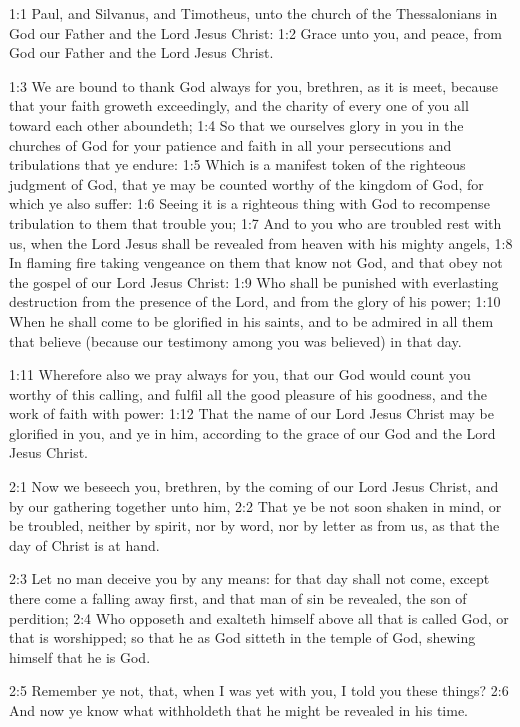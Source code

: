 

1:1 Paul, and Silvanus, and Timotheus, unto the church of the
Thessalonians in God our Father and the Lord Jesus Christ: 1:2 Grace
unto you, and peace, from God our Father and the Lord Jesus Christ.

1:3 We are bound to thank God always for you, brethren, as it is meet,
because that your faith groweth exceedingly, and the charity of every
one of you all toward each other aboundeth; 1:4 So that we ourselves
glory in you in the churches of God for your patience and faith in all
your persecutions and tribulations that ye endure: 1:5 Which is a
manifest token of the righteous judgment of God, that ye may be
counted worthy of the kingdom of God, for which ye also suffer: 1:6
Seeing it is a righteous thing with God to recompense tribulation to
them that trouble you; 1:7 And to you who are troubled rest with us,
when the Lord Jesus shall be revealed from heaven with his mighty
angels, 1:8 In flaming fire taking vengeance on them that know not
God, and that obey not the gospel of our Lord Jesus Christ: 1:9 Who
shall be punished with everlasting destruction from the presence of
the Lord, and from the glory of his power; 1:10 When he shall come to
be glorified in his saints, and to be admired in all them that believe
(because our testimony among you was believed) in that day.

1:11 Wherefore also we pray always for you, that our God would count
you worthy of this calling, and fulfil all the good pleasure of his
goodness, and the work of faith with power: 1:12 That the name of our
Lord Jesus Christ may be glorified in you, and ye in him, according to
the grace of our God and the Lord Jesus Christ.

2:1 Now we beseech you, brethren, by the coming of our Lord Jesus
Christ, and by our gathering together unto him, 2:2 That ye be not
soon shaken in mind, or be troubled, neither by spirit, nor by word,
nor by letter as from us, as that the day of Christ is at hand.

2:3 Let no man deceive you by any means: for that day shall not come,
except there come a falling away first, and that man of sin be
revealed, the son of perdition; 2:4 Who opposeth and exalteth himself
above all that is called God, or that is worshipped; so that he as God
sitteth in the temple of God, shewing himself that he is God.

2:5 Remember ye not, that, when I was yet with you, I told you these
things?  2:6 And now ye know what withholdeth that he might be
revealed in his time.

